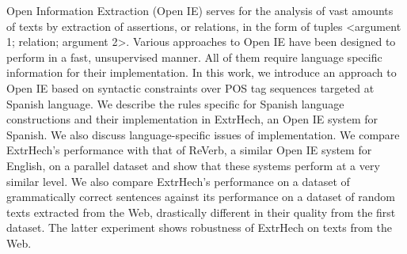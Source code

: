 Open Information Extraction (Open IE) serves for the analysis of vast amounts of texts by extraction of assertions, or relations, in the form of tuples <argument 1; relation; argument 2>. Various approaches to Open IE have been designed to perform in a fast, unsupervised manner. All of them require language specific information for their implementation. In this work, we introduce an approach to Open IE based on syntactic constraints over POS tag sequences targeted at Spanish language. We describe the rules specific for Spanish language constructions and their implementation in ExtrHech, an Open IE system for Spanish. We also discuss language-specific issues of implementation. We compare ExtrHech's performance with that of ReVerb, a similar Open IE system for English, on a parallel dataset and show that these systems perform at a very similar level. We also compare ExtrHech's performance on a dataset of grammatically correct sentences against its performance on a dataset of random texts extracted from the Web, drastically different in their quality from the first dataset. The latter experiment shows robustness of ExtrHech on texts from the Web.
